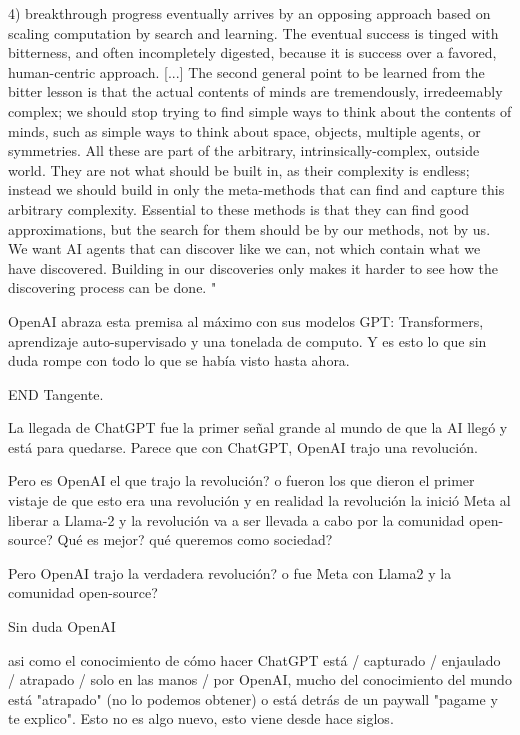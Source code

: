 4) breakthrough progress eventually arrives by an opposing approach based on scaling computation by search and learning. 
The eventual success is tinged with bitterness, and often incompletely digested, because it is success over a favored, 
human-centric approach. 
[...]
The second general point to be learned from the bitter lesson is that the actual contents of minds are tremendously, 
irredeemably complex; we should stop trying to find simple ways to think about the contents of minds, such as simple 
ways to think about space, objects, multiple agents, or symmetries. All these are part of the arbitrary, intrinsically-complex, 
outside world. They are not what should be built in, as their complexity is endless; instead we should build in only the 
meta-methods that can find and capture this arbitrary complexity. Essential to these methods is that they can find good 
approximations, but the search for them should be by our methods, not by us. We want AI agents that can discover like 
we can, not which contain what we have discovered. Building in our discoveries only makes it harder to see how the discovering process can be done.
"

OpenAI abraza esta premisa al máximo con sus modelos GPT: Transformers, aprendizaje auto-supervisado y una tonelada de computo. Y es esto
lo que sin duda rompe con todo lo que se había visto hasta ahora. 


END Tangente. 


La llegada de ChatGPT fue la primer señal grande al mundo de que la AI llegó y está para quedarse. 
Parece que con ChatGPT, OpenAI trajo una revolución. 

Pero es OpenAI el que trajo la revolución? o fueron los que dieron el primer vistaje de que esto era una revolución y en realidad la revolución
la inició Meta al liberar a Llama-2 y la revolución va a ser llevada a cabo por la comunidad open-source?
Qué es mejor? qué queremos como sociedad?

Pero OpenAI trajo la verdadera revolución? o fue Meta con Llama2 y la comunidad open-source?

Sin duda OpenAI 

asi como el conocimiento de cómo hacer ChatGPT está / capturado / enjaulado / atrapado / solo en las manos / por OpenAI, 
mucho del conocimiento del mundo está "atrapado" (no lo podemos obtener) o está detrás de un paywall "pagame y te explico". 
Esto no es algo nuevo, esto viene desde hace siglos. 




